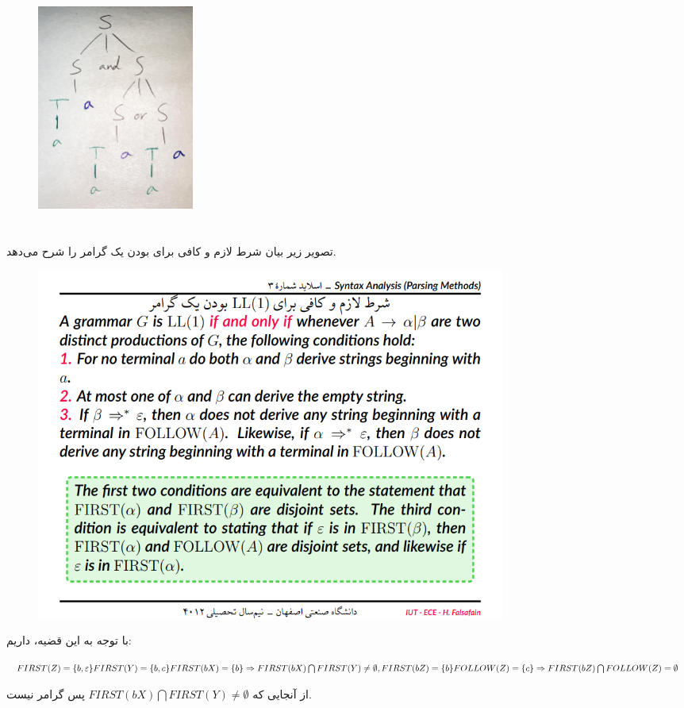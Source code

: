\documentclass{article}
\begin{document}
\subsection{}
\begin{figure}[H]
    \centering
    \includegraphics[width=0.25\textwidth]{figures/c2.jpg}
    \caption
	{}
    \label{fig:fig1}
\end{figure}


\section{}%
\subsection{}
تصویر زیر بیان شرط لازم و کافی برای  بودن یک گرامر را شرح می‌دهد.
\begin{figure}[H]
    \centering
    \includegraphics[width=0.75\textwidth]{figures/3a.png}
    \caption
	{}
    \label{fig:fig1}
\end{figure}
با توجه به این قضیه، داریم:

\begin{latin}
$
FIRST(Z) = \lbrace b, \varepsilon \rbrace \\
FIRST(Y) = \lbrace b, c \rbrace \\
FIRST(bX) = \lbrace b \rbrace \\
\Rightarrow FIRST(bX) \bigcap FIRST(Y) \neq \emptyset \\
, \\
FIRST(bZ) = \lbrace b \rbrace \\
FOLLOW(Z) = \lbrace c \rbrace \\
\Rightarrow FIRST(bZ) \bigcap FOLLOW(Z) = \emptyset
$
\end{latin}
از آنجایی که $FIRST(bX) \bigcap FIRST(Y) \neq \emptyset$ پس گرامر  نیست.
\end{document}
